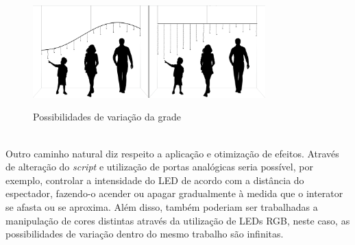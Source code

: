 \begin{figure}[H]
    \centering
    \caption{Possibilidades de variação da grade}
	\vspace*{0,2cm}
    \includegraphics[width=0.8\textwidth]{./04-figuras/malha_futuro}
    \label{fig:malha_futuro}
\end{figure}
\vspace*{-0,9cm}
{\raggedright {}}\\


Outro caminho natural diz respeito a aplicação e otimização de efeitos. Através de alteração do \textit{script} e utilização de portas analógicas seria possível, por exemplo, controlar a intensidade do LED de acordo com a distância do espectador, fazendo-o acender ou apagar gradualmente à medida que o interator se afasta ou se aproxima. Além disso, também poderiam ser trabalhadas a manipulação de cores distintas através da utilização de LEDs RGB, neste caso, as possibilidades de variação dentro do mesmo trabalho são infinitas.

